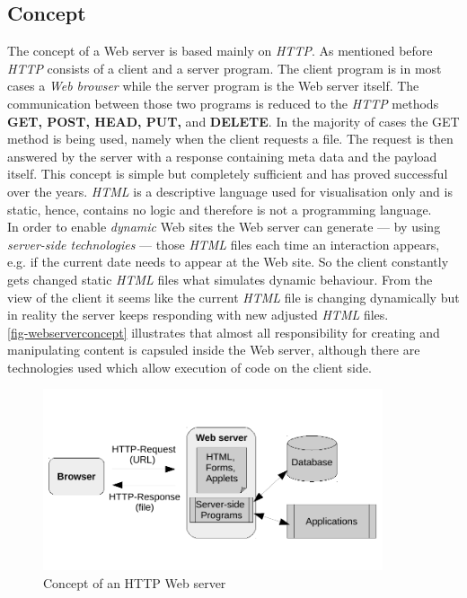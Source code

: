 \documentclass[
  a4paper,               %
  twoside,               %
  headings=small,        %
  DIV=12,                %
  BCOR=1cm,              %
  headinclude=true,      %
  footinclude=true,      %
  numbers=noenddot,      %
  11pt]{scrartcl}        %
\begin{document}
\subsection{Concept}
The concept of a Web server is based mainly on \textit{HTTP}. As mentioned before \textit{HTTP} consists of a client and a server program. The client program is in most cases a \textit{Web browser} while the server program is the Web server itself. The communication between those two programs is reduced to the \textit{HTTP} methods \textbf{GET, POST, HEAD, PUT,} and \textbf{DELETE}. In the majority of cases the GET method is being used, namely when the client requests a file. The request is then answered by the server with a response containing meta data and the payload itself. This concept is simple but completely sufficient and has proved successful over the years. \textit{HTML} is a descriptive language used for visualisation only and is static, hence, contains no logic and therefore is not a programming language.\\
In order to enable \textit{dynamic} Web sites the Web server can generate --- by using \textit{server-side technologies} --- those \textit{HTML} files each time an interaction appears, e.g. if the current date needs to appear at the Web site. So the client constantly gets changed static \textit{HTML} files what simulates dynamic behaviour. From the view of the client it seems like the current \textit{HTML} file is changing dynamically but in reality the server keeps responding with new adjusted \textit{HTML} files.\\
\autoref{fig-webserverconcept} illustrates  that almost all responsibility for creating and manipulating content is capsuled inside the Web server, although there are technologies used which allow execution of code on the client side. 

\begin{figure}[h]
  \centerline{\includegraphics[width=10cm]{pics/webclient.pdf}}
  \caption{Concept of an HTTP Web server}
  \label{fig-webserverconcept}
\end{figure}
\end{document}
